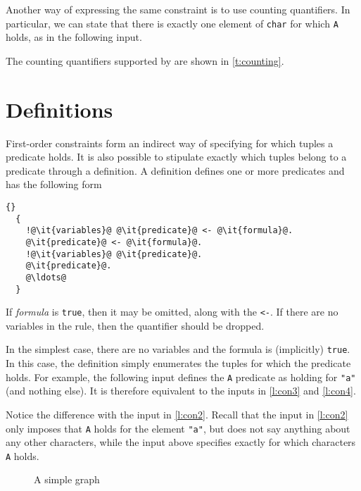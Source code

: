 \documentclass{article}
\begin{document}
Another way of expressing the same constraint is to use counting quantifiers.
In particular, we can state that there is exactly one element of
\texttt{char} for which \texttt{A} holds, as in the following input.

The counting quantifiers supported by \idp are shown in
\autoref{t:counting}.

\section{Definitions}\label{s:definitions}

First-order constraints form an indirect way of specifying
for which tuples a predicate holds.
It is also possible to stipulate exactly which tuples
belong to a predicate through a definition.
A definition defines one or more predicates and has the following
form
\begin{lstlisting}[escapechar=@]{}
  {
    !@\it{variables}@ @\it{predicate}@ <- @\it{formula}@.
    @\it{predicate}@ <- @\it{formula}@.
    !@\it{variables}@ @\it{predicate}@.
    @\it{predicate}@.
    @\ldots@
  }
\end{lstlisting}
If \textit{formula} is \texttt{true}, then it may be omitted, along with
the \texttt{<-}.  If there are no variables in the rule, then the
quantifier should be dropped.

In the simplest case, there are no variables and the formula is
(implicitly) \texttt{true}.  In this case, the definition simply
enumerates the tuples for which the predicate holds.
For example, the following input defines the \texttt{A} predicate
as holding for \texttt{"a"} (and nothing else).
It is therefore equivalent to the inputs in \autoref{l:con3}
and \autoref{l:con4}.

Notice the difference with the input in \autoref{l:con2}.
Recall that the input in \autoref{l:con2} only imposes that \texttt{A} holds
for the element \lstinline!"a"!, but does not say anything about any
other characters, while the input above specifies exactly for which
characters \texttt{A} holds.

\begin{figure}
\centering%
\caption{A simple graph}
\label{f:graph}
\end{figure}
\end{document}
